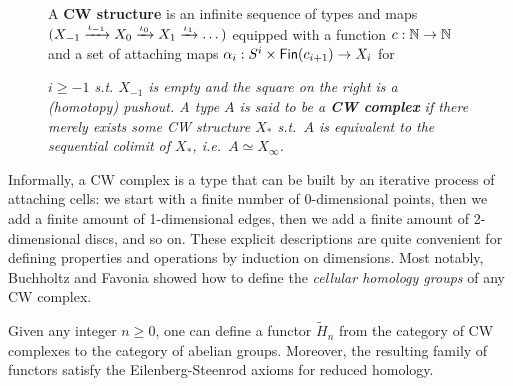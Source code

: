 \documentclass[a4page]{article}
\begin{document}
\begin{figure}[H]
\begin{minipage}{0.68 \linewidth}
\begin{definition}
  A \textbf{CW structure} is an infinite sequence of types and maps
  $(X_{-1} \xrightarrow{\textnormal{\ensuremath{\iota_{-1}}}} X_0 \xrightarrow{\textnormal{\ensuremath{\iota_{0}}}} X_1 \xrightarrow{\textnormal{\ensuremath{\iota_{1}}}} \dots )$
  equipped with a function $c : \mathbb{N} \to \mathbb{N}$ and a set of attaching maps $\alpha_i : S^i \times \textnormal{\ensuremath{\mathsf{Fin}({c_{i+1}})}} \to X_i$ for
\end{definition}
\end{minipage}
\vspace{-.1cm}
\hspace{.1cm}
\begin{minipage}{0.32 \linewidth}
\end{minipage}
\emph{$i \geq -1$ s.t. $X_{-1}$ is empty and the square on the right is a (homotopy) pushout.
  A type $A$ is said to be a \textbf{CW complex} if there merely exists some
  CW structure $X_\ast$ s.t.\ $A$ is equivalent to the sequential colimit
  of $X_\ast$, i.e.\ $A \simeq X_\infty$.}
\end{figure}
%
Informally, a CW complex is a type that can be built by an iterative process of attaching
cells: we start with a finite number of 0-dimensional points, then we add a finite
amount of 1-dimensional edges, then we add a finite amount of 2-dimensional discs, and so on.
%
These explicit descriptions are quite convenient for defining properties and operations by
induction on dimensions. Most notably, Buchholtz and Favonia showed how to define the
\emph{cellular homology groups} of any CW complex.

\begin{proposition}
  Given any integer \( n \ge 0 \), one can define a functor \( \widetilde{H}_n \) from the
  category of CW complexes to the category of abelian groups.
  Moreover, the resulting family of functors satisfy the Eilenberg-Steenrod axioms for reduced homology.
\end{proposition}
\end{document}
